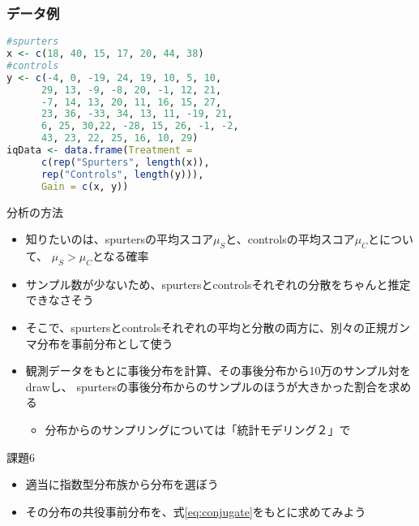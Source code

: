 \documentclass[aspectratio=169,unicode,dvipdfmx,14pt]{beamer}
\begin{document}
\begin{frame}[fragile]
\FontMath
\frametitle{データ例}
\begin{lstlisting}[language=R]
#spurters
x <- c(18, 40, 15, 17, 20, 44, 38)
#controls
y <- c(-4, 0, -19, 24, 19, 10, 5, 10,
      29, 13, -9, -8, 20, -1, 12, 21,
      -7, 14, 13, 20, 11, 16, 15, 27,
      23, 36, -33, 34, 13, 11, -19, 21,
      6, 25, 30,22, -28, 15, 26, -1, -2,
      43, 23, 22, 25, 16, 10, 29)
iqData <- data.frame(Treatment =
      c(rep("Spurters", length(x)),
      rep("Controls", length(y))),
      Gain = c(x, y))
\end{lstlisting}
\end{frame}

\begin{frame}{分析の方法}
\begin{itemize}
\item 知りたいのは、spurtersの平均スコア$\mu_S$と、controlsの平均スコア$\mu_C$とについて、
$\mu_S > \mu_C$となる確率
\item サンプル数が少ないため、spurtersとcontrolsそれぞれの分散をちゃんと推定できなさそう
\item そこで、spurtersとcontrolsそれぞれの平均と分散の両方に、別々の正規ガンマ分布を事前分布として使う
\item 観測データをもとに事後分布を計算、その事後分布から10万のサンプル対をdrawし、
spurtersの事後分布からのサンプルのほうが大きかった割合を求める
\begin{itemize}
\item 分布からのサンプリングについては「統計モデリング２」で
\end{itemize}
\end{itemize}
\end{frame}


\begin{frame}{課題6}
\begin{itemize}
\item 適当に指数型分布族から分布を選ぼう
\item その分布の共役事前分布を、式\eqref{eq:conjugate}をもとに求めてみよう
\end{itemize}
\end{frame}
\end{document}
